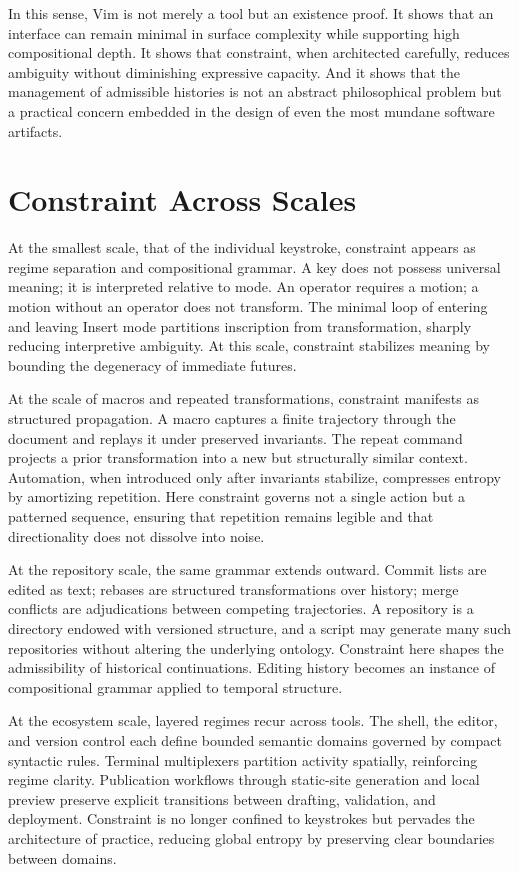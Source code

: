 \documentclass[12pt]{article}
\begin{document}
In this sense, Vim is not merely a tool but an existence proof. It shows that an interface can remain minimal in surface complexity while supporting high compositional depth. It shows that constraint, when architected carefully, reduces ambiguity without diminishing expressive capacity. And it shows that the management of admissible histories is not an abstract philosophical problem but a practical concern embedded in the design of even the most mundane software artifacts.

\section{Constraint Across Scales}

At the smallest scale, that of the individual keystroke, constraint appears as regime separation and compositional grammar. A key does not possess universal meaning; it is interpreted relative to mode. An operator requires a motion; a motion without an operator does not transform. The minimal loop of entering and leaving Insert mode partitions inscription from transformation, sharply reducing interpretive ambiguity. At this scale, constraint stabilizes meaning by bounding the degeneracy of immediate futures.

At the scale of macros and repeated transformations, constraint manifests as structured propagation. A macro captures a finite trajectory through the document and replays it under preserved invariants. The repeat command projects a prior transformation into a new but structurally similar context. Automation, when introduced only after invariants stabilize, compresses entropy by amortizing repetition. Here constraint governs not a single action but a patterned sequence, ensuring that repetition remains legible and that directionality does not dissolve into noise.

At the repository scale, the same grammar extends outward. Commit lists are edited as text; rebases are structured transformations over history; merge conflicts are adjudications between competing trajectories. A repository is a directory endowed with versioned structure, and a script may generate many such repositories without altering the underlying ontology. Constraint here shapes the admissibility of historical continuations. Editing history becomes an instance of compositional grammar applied to temporal structure.

At the ecosystem scale, layered regimes recur across tools. The shell, the editor, and version control each define bounded semantic domains governed by compact syntactic rules. Terminal multiplexers partition activity spatially, reinforcing regime clarity. Publication workflows through static-site generation and local preview preserve explicit transitions between drafting, validation, and deployment. Constraint is no longer confined to keystrokes but pervades the architecture of practice, reducing global entropy by preserving clear boundaries between domains.
\end{document}
